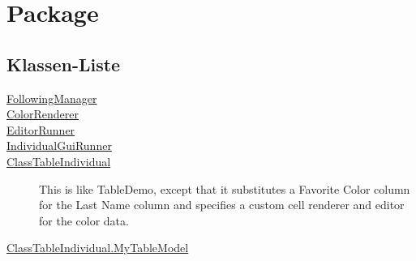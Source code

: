 
\chapter[Package ontologyFramework.OFErrorManagement.OFGUI.individualGui]{Package }\label{ontologyFramework.OFErrorManagement.OFGUI.individualGui-package}



\section{Klassen-Liste}
\begin{description}
\item[{\hyperlink{ontologyFramework.OFErrorManagement.OFGUI.individualGui.FollowingManager-class}{FollowingManager}}]

\hfill\pageref{ontologyFramework.OFErrorManagement.OFGUI.individualGui.FollowingManager-class}

\item[{\hyperlink{ontologyFramework.OFErrorManagement.OFGUI.individualGui.ColorRenderer-class}{ColorRenderer}}]

\hfill\pageref{ontologyFramework.OFErrorManagement.OFGUI.individualGui.ColorRenderer-class}

\item[{\hyperlink{ontologyFramework.OFErrorManagement.OFGUI.individualGui.EditorRunner-class}{EditorRunner}}]

\hfill\pageref{ontologyFramework.OFErrorManagement.OFGUI.individualGui.EditorRunner-class}

\item[{\hyperlink{ontologyFramework.OFErrorManagement.OFGUI.individualGui.IndividualGuiRunner-class}{IndividualGuiRunner}}]

\hfill\pageref{ontologyFramework.OFErrorManagement.OFGUI.individualGui.IndividualGuiRunner-class}

\item[{\hyperlink{ontologyFramework.OFErrorManagement.OFGUI.individualGui.ClassTableIndividual-class}{ClassTableIndividual}}]
This is like TableDemo, except that it substitutes a
 Favorite Color column for the Last Name column and specifies
 a custom cell renderer and editor for the color data.
\hfill\pageref{ontologyFramework.OFErrorManagement.OFGUI.individualGui.ClassTableIndividual-class}

\item[{\hyperlink{ontologyFramework.OFErrorManagement.OFGUI.individualGui.ClassTableIndividual.MyTableModel-class}{ClassTableIndividual.MyTableModel}}]

\hfill\pageref{ontologyFramework.OFErrorManagement.OFGUI.individualGui.ClassTableIndividual.MyTableModel-class}

\end{description}
